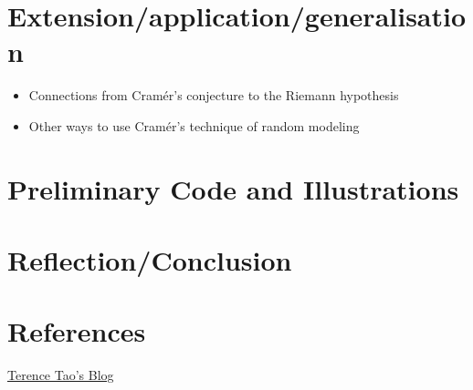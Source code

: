 \documentclass[12pt, letterpaper]{article}
\begin{document}
\section{Extension/application/generalisation}
\begin{itemize}
    \item Connections from Cram\'er's conjecture to the Riemann hypothesis
    \item Other ways to use Cram\'er's technique of random modeling
\end{itemize}


\section{Preliminary Code and Illustrations}


\section{Reflection/Conclusion}


\section{References}

\href{http://terrytao.wordpress.com/2015/01/04/254a-supplement-4-probabilistic-models-and-heuristics-for-the-primes-optional/#more-7956}{Terence Tao's Blog}

 
\end{document}
